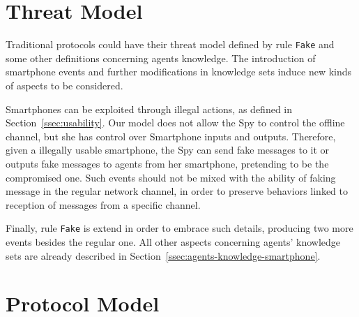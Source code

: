 \section{Threat Model}
Traditional protocols could have their threat model defined by rule \texttt{Fake} and some other definitions concerning agents knowledge. The introduction of smartphone events and further modifications in knowledge sets induce new kinds of aspects to be considered.

Smartphones can be exploited through illegal actions, as defined in Section~\ref{ssec:usability}. Our model does not allow the Spy to control the offline channel, but she has control over Smartphone inputs and outputs. Therefore, given a illegally usable smartphone, the Spy can send fake messages to it or outputs fake messages to agents from her smartphone, pretending to be the compromised one. Such events should not be mixed with the ability of faking message in the regular network channel, in order to preserve behaviors linked to reception of messages from a specific channel.

Finally, rule \texttt{Fake} is extend in order to embrace such details, producing two more events besides the regular one. All other aspects concerning agents' knowledge sets are already described in Section~\ref{ssec:agents-knowledge-smartphone}.


\section{Protocol Model}
